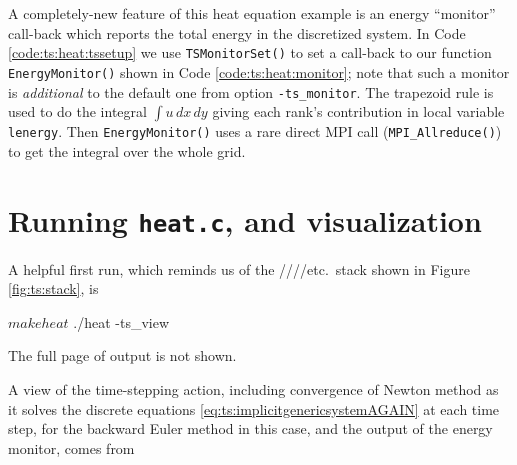 
A completely-new feature of this heat equation example is an energy ``monitor'' call-back which reports the total energy in the discretized system.  In Code \ref{code:ts:heat:tssetup} we use \texttt{TSMonitorSet()} to set a call-back to our function \texttt{EnergyMonitor()} shown in Code \ref{code:ts:heat:monitor}; note that such a monitor is \emph{additional} to the default one from option \texttt{-ts\_monitor}.  The trapezoid rule is used to do the integral $\int u\,dx\,dy$ giving each rank's contribution in local variable \texttt{lenergy}.  Then \texttt{EnergyMonitor()} uses a rare direct MPI call (\texttt{MPI\_Allreduce()}) to get the integral over the whole grid.




\section{Running \texttt{heat.c}, and visualization}

A helpful first run, which reminds us of the \pTS/\pSNES/\pKSP/\pPC/etc.~stack shown in Figure \ref{fig:ts:stack}, is
\begin{cline}
$ make heat
$ ./heat -ts_view
\end{cline}
The full page of output is not shown.

A view of the time-stepping action, including convergence of Newton method as it solves the discrete equations \eqref{eq:ts:implicitgenericsystemAGAIN} at each time step, for the backward Euler method in this case, and the output of the energy monitor, comes from

